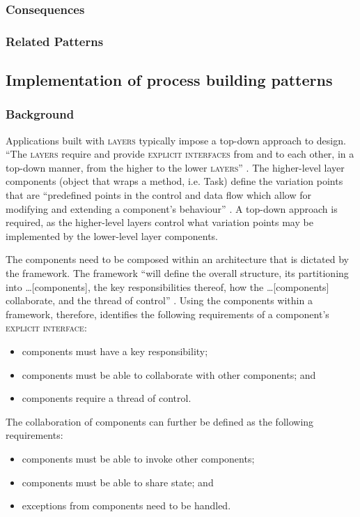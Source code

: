 \documentclass[prodmode]{style/acmlarge}
\begin{document}
\subsubsection*{Consequences}

\subsubsection*{Related Patterns}



\subsection{Implementation of process building patterns}

\subsubsection*{Background}

Applications built with \textsc{layers} typically impose a top-down approach to
design.  ``The \textsc{layers} require and provide \textsc{explicit interfaces}
from and to each other, in a top-down manner, from the higher to the lower
\textsc{layers}'' \cite[p. 11]{ioc}.  The higher-level layer components (object
that wraps a method, i.e. Task) define the variation points that are
``predefined points in the control and data flow which allow for modifying and
extending a component's behaviour'' \cite[p. 5]{ioc}.  A top-down approach is
required, as the higher-level layers control what variation points may be
implemented by the lower-level layer components.

The components need to be composed within an architecture that is dictated by
the framework.  The framework ``will define the overall structure, its
partitioning into \ldots [components], the key responsibilities thereof, how the
\ldots [components] collaborate, and the thread of control'' \cite[p.26]{gof}.
Using the components within a framework, therefore, identifies the following
requirements of a component's \textsc{explicit interface}:
\begin{itemize}
  \item components must have a key responsibility;
  \item components must be able to collaborate with other components; and
  \item components require a thread of control.
\end{itemize}

The collaboration of components can further be defined as the following
requirements:
\begin{itemize}
  \item components must be able to invoke other components;
  \item components must be able to share state; and
  \item exceptions from components need to be handled.
\end{itemize}
\end{document}
